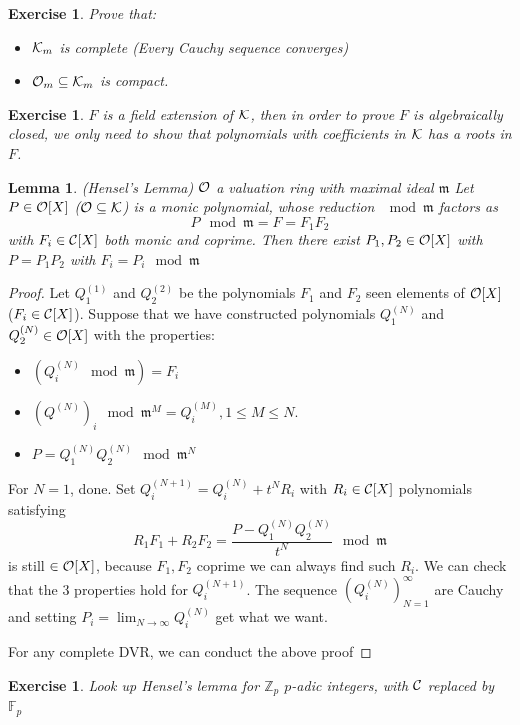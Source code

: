 \documentclass[11pt]{article}
\newtheorem{lemma}[thm]{Lemma}
\newtheorem{exercise}[thm]{Exercise}
\newcommand{\intg}{\mathbb Z}
\newcommand{\bbf}{\mathbb F}
\newcommand{\scm}{{\mathfrak m}}
\newcommand{\calc}{{\cal C}}
\newcommand{\calk}{{\cal K}}
\newcommand{\calo}{{\cal O}}
\newcommand{\lrta}{\longrightarrow}
\begin{document}
\begin{exercise}Prove that:
\begin{itemize}
\item $\calk_m$ is complete (Every Cauchy sequence converges)
\item $\calo_m\subseteq \calk_m$ is compact.
\end{itemize}
\end{exercise}

\begin{exercise}
$F$ is a field extension of $\calk$, then in order to prove $F$ is algebraically closed, we only need to show that polynomials with coefficients in $\calk$ has a roots in $F$.
\end{exercise}

\begin{lemma}\label{lem:Hensel's_lemma}
(Hensel's Lemma) $\calo$ a valuation ring with maximal ideal $\scm$ Let $P\in\calo[X]$ ($\calo\subseteq\calk$) is  a monic polynomial, whose reduction $\mod\scm$ factors as 
$$
P\mod \scm=F=F_1 F_2
$$ 
with $F_i\in \calc[X]$ both monic and coprime. Then there exist $P_1,P_2\in\calo[X]$ with $P=P_1P_2$ with $F_i=P_i\mod \scm$
\end{lemma}
\begin{proof}
Let $Q^{(1)}_1$ and $Q^{(2)}_2$ be the polynomials $F_1$ and $F_2$ seen elements of $\calo[X]$ ($F_i\in \calc[X]$). Suppose that we have constructed polynomials $Q_1^{(N)}$ and $Q^{(N)}_2\in\calo[X]$ with the properties:
\begin{itemize}
\item $(Q^{(N)}_i \mod \scm)=F_i$
\item $(Q^{(N)})_i\mod \scm^M=Q^{(M)}_i,1\leq M\leq N.$
\item $P=Q^{(N)}_1 Q^{(N)}_2\mod \scm^N$
\end{itemize}
For $N=1$, done. Set $Q^{(N+1)}_i=Q^{(N)}_i+t^N R_i$ with $R_i\in \calc[X]$ polynomials satisfying 
$$
R_1F_1+R_2F_2=\frac{P-Q^{(N)}_1Q^{(N)}_2}{t^N}\mod \scm
$$
is still $\in\calo[X]$, because $F_1,F_2$ coprime we can always find such $R_i$. We can check that the 3 properties hold for $Q^{(N+1)}_i$. The sequence $(Q_i^{(N)})^\infty_{N=1}$ are Cauchy and setting $P_i=\lim_{N\lrta \infty}Q^{(N)}_i$ get what we want.

For any complete DVR, we can conduct the above proof
\end{proof}

\begin{exercise}
Look up Hensel's lemma for $\intg_p$ $p$-adic integers, with $\calc$ replaced by $\bbf_p$
\end{exercise}
\end{document}

